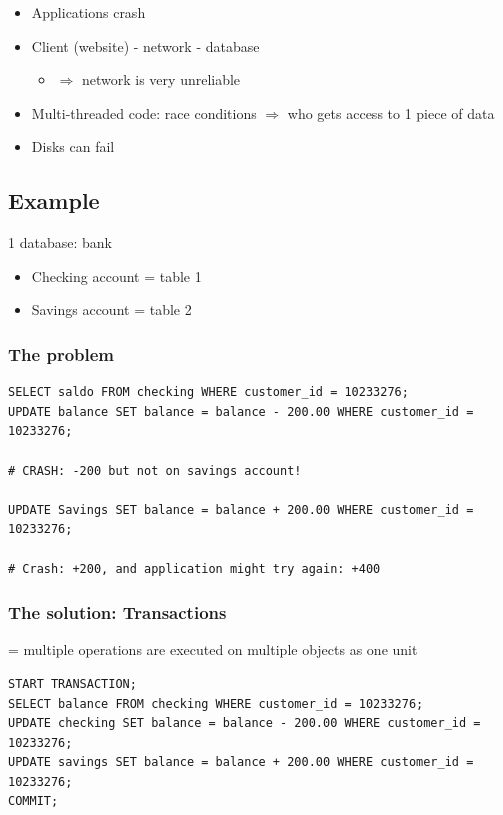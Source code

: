 \documentclass{article}
\begin{document}
\begin{itemize}
    \item Applications crash
    \item Client (website) - network - database
    \begin{itemize}
        \item $\Rightarrow$ network is very unreliable
    \end{itemize}
    \item Multi-threaded code: race conditions $\Rightarrow$ who gets access to 1 piece of data
    \item Disks can fail
\end{itemize}

\subsection{Example}


1 database: bank

\begin{itemize}
    \item Checking account = table 1
    \item Savings account = table 2
\end{itemize}

\subsubsection{The problem}

\begin{verbatim}
SELECT saldo FROM checking WHERE customer_id = 10233276;
UPDATE balance SET balance = balance - 200.00 WHERE customer_id = 10233276;

# CRASH: -200 but not on savings account!
    
UPDATE Savings SET balance = balance + 200.00 WHERE customer_id = 10233276;

# Crash: +200, and application might try again: +400
\end{verbatim}

\subsubsection{The solution: Transactions}

= multiple operations are executed on multiple objects as one unit

\begin{verbatim}
START TRANSACTION;
SELECT balance FROM checking WHERE customer_id = 10233276;
UPDATE checking SET balance = balance - 200.00 WHERE customer_id = 10233276;
UPDATE savings SET balance = balance + 200.00 WHERE customer_id = 10233276;
COMMIT;
\end{verbatim}
\end{document}
